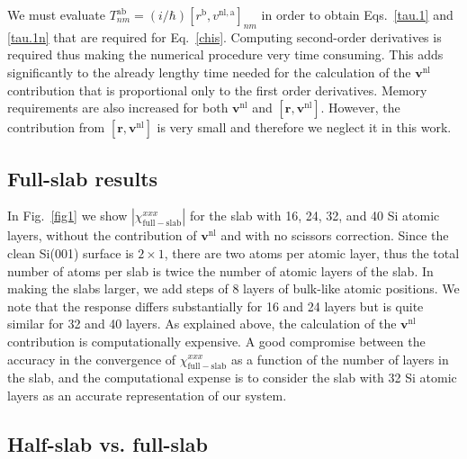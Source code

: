 \documentclass[floatfix,prb,aps,superscriptaddress,showpacs,11pt,preprint,letterpaper]{revtex4}
\begin{document}
We must evaluate 
$T^{\mathrm{a}\mathrm{b}}_{nm}=(i/\hbar)[r^\mathrm{b},v^{\mathrm{nl},\mathrm{a}}]_{nm}$
in order to obtain 
Eqs.~\eqref{tau.1} and \eqref{tau.1n} that are required for 
Eq.~\eqref{chis}.
Computing second-order 
derivatives is required thus making the numerical procedure very 
time consuming. This adds significantly to the already lengthy time needed 
for the calculation of the $\mathbf{v}^\mathrm{nl}$ contribution that is
proportional only to 
the first order derivatives. 
Memory requirements are also increased for both $\mathbf{v}^\mathrm{nl}$ and 
$[\mathbf{r},\mathbf{v}^\mathrm{nl}]$. However, the contribution from $[\mathbf{r},\mathbf{v}^\mathrm{nl}]$ 
is very small\cite{valerie} and therefore we neglect it in this work.

\subsection{Full-slab results}\label{fsresults}

In Fig.~\ref{fig1} we show $|\chi_{\mathrm{full-slab}}^{xxx}|$
for the slab with
16, 24, 32, and 40 Si atomic layers, without the contribution of
$\mathbf{v}^{\mathrm{nl}}$ and with no scissors correction.
Since the clean Si(001) surface is $2\times 1$,
there are two atoms per atomic layer, thus the total number of atoms per slab is 
twice the number of atomic layers of the slab. 
In making the slabs larger, we add steps of 8 layers of bulk-like atomic positions. 
We note that the response differs substantially 
for 16 and 24 layers but is quite similar for 32 and 40 layers.
As explained above,
the calculation of the $\mathbf{v}^\mathrm{nl}$ contribution is 
computationally expensive.
A good compromise between the accuracy in the convergence of
$\chi^{xxx}_{\mathrm{full-slab}}$ as a function of the number
of layers in the slab, and the computational 
expense is to consider
the slab with 32 Si atomic layers as 
an accurate representation of our 
system.

\subsection{Half-slab vs. full-slab}
\end{document}
